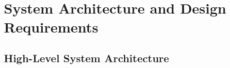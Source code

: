 \chapter{System Architecture and Design Requirements}\label{sec:system_architecture}

\section{High-Level System Architecture}\label{sec:High level}

